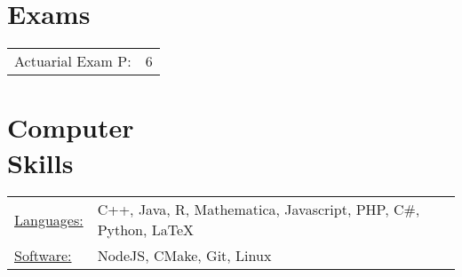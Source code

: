 \documentclass[margin]{res}
\begin{document}
\begin{resume}
\section{Exams}
\begin{tabular}{l p{3in}}
Actuarial Exam P: & 6
\end{tabular}


\section{Computer \\ Skills}
\begin{tabular}{l p{3in}}
\underline{Languages:} & C++, Java, R, Mathematica, 
Javascript, PHP, C\#, Python, \LaTeX \\
\underline{Software:} &  NodeJS, CMake, Git, Linux
\end{tabular}

\end{resume} 
\end{document}
